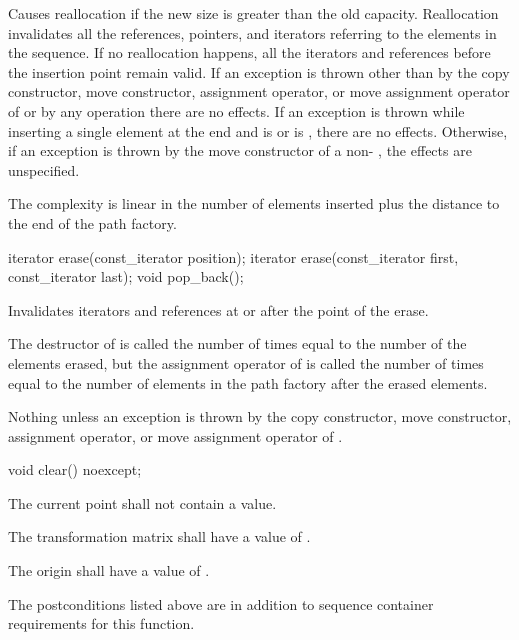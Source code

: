 \begin{itemdescr}
	\pnum
	\remarks
	Causes reallocation if the new size is greater than the old capacity.
	Reallocation invalidates all the references, pointers, and iterators
	referring to the elements in the sequence.
	If no reallocation happens, all the iterators and references before the insertion point remain valid.
	If an exception is thrown other than by
	the copy constructor, move constructor,
	assignment operator, or move assignment operator of
	 or by any  operation
	there are no effects.
	If an exception is thrown while inserting a single element at the end and
	 is  or 
	is , there are no effects.
	Otherwise, if an exception is thrown by the move constructor of a non-
	, the effects are unspecified.
	
	\pnum
	\complexity
	The complexity is linear in the number of elements inserted plus the 
	distance to the end of the path factory.
\end{itemdescr}

\begin{itemdecl}
	iterator erase(const_iterator position);
	iterator erase(const_iterator first, const_iterator last);
	void pop_back();
\end{itemdecl}

\begin{itemdescr}
	\pnum
	\effects
	Invalidates iterators and references at or after the point of the erase.
	
	\pnum
	\complexity
	The destructor of  is called the number of times equal to 
	the number of the elements erased, but the assignment operator
	of  is called the number of times equal to the number of
	elements in the path factory after the erased elements.
	
	\pnum
	\throws
	Nothing unless an exception is thrown by the copy constructor, move 
	constructor, assignment operator, or move assignment operator of
	.
\end{itemdescr}

\begin{itemdecl}
	void clear() noexcept;
\end{itemdecl}
\begin{itemdescr}
	\pnum
	\postconditions
	\pnum
	The current point shall not contain a value.
	
	\pnum
	The transformation matrix shall have a value of .
	
	\pnum
	The origin shall have a value of .
	
	\pnum
	\remarks
	The postconditions listed above are in addition to sequence container requirements for this function.
\end{itemdescr}

